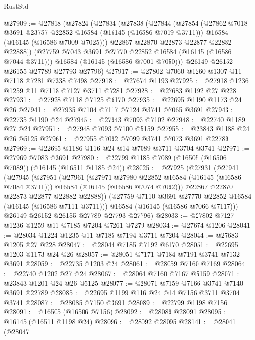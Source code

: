 \begin{lexlean}{RustStd}
\begin{coremodule}
@27909 := @27818
    (@27824
      (@27834
        (@27838
          (@27844
            (@27854
              (@27862 @7018 @3691 @23757 @22852 @16584 (@16145 (@16586 @7019 @3711)))
              @16584
              (@16145 (@16586 @7009 @7025)))
            @22867
            @22870
            @22873
            @22877
            @22882
            @22888))
        (@27759 @7043 @3691 @27770 @22852 @16584 (@16145 (@16586 @7044 @3711)))
        @16584
        (@16145 (@16586 @7001 @7050)))
      @26149
      @26152
      @26155
      @27789
      @27793
      @27796)
@27917 := @27802 @7060 @1260 @1307 @11 @7118 @7281 @7338 @7498
@27918 := @27674 @1193
@27925 := @27918 @1236 @1259 @11 @7118 @7127 @3711 @7281
@27928 := @27683 @1192 @27 @228
@27931 := @27928 @7118 @7125 @6170
@27935 := @22695 @1190 @1173 @24 @26
@27941 := @27935 @7104 @7117 @7124 @3741 @7065 @3691
@27943 := @22735 @1190 @24
@27945 := @27943 @7093 @7102
@27948 := @22740 @1189 @27 @24
@27951 := @27948 @7093 @7100 @5159
@27955 := @23843 @1188 @24 @26 @5125
@27961 := @27955 @7092 @7099 @3741 @7073 @3691 @22789
@27969 := @22695 @1186 @116 @24 @14 @7089 @3711 @3704 @3741
@27971 := @27969 @7083 @3691
@27980 := @22799 @1185 @7089 (@16505 (@16506 @7089)) (@16145 (@16511 @1185 @24))
@28025 := @27925
    (@27931
      (@27941
        (@27945
          (@27951
            (@27961
              (@27971 @27980 @22852 @16584 (@16145 (@16586 @7084 @3711)))
              @16584
              (@16145 (@16586 @7074 @7092)))
            @22867
            @22870
            @22873
            @22877
            @22882
            @22888))
        (@27759 @7110 @3691 @27770 @22852 @16584 (@16145 (@16586 @7111 @3711)))
        @16584
        (@16145 (@16586 @7066 @7117)))
      @26149
      @26152
      @26155
      @27789
      @27793
      @27796)
@28033 := @27802 @7127 @1236 @1259 @11 @7185 @7204 @7261 @7279
@28034 := @27674 @1206
@28041 := @28034 @1224 @1235 @11 @7185 @7194 @3711 @7204
@28044 := @27683 @1205 @27 @228
@28047 := @28044 @7185 @7192 @6170
@28051 := @22695 @1203 @1173 @24 @26
@28057 := @28051 @7171 @7184 @7191 @3741 @7132 @3691
@28059 := @22735 @1203 @24
@28061 := @28059 @7160 @7169
@28064 := @22740 @1202 @27 @24
@28067 := @28064 @7160 @7167 @5159
@28071 := @23843 @1201 @24 @26 @5125
@28077 := @28071 @7159 @7166 @3741 @7140 @3691 @22789
@28085 := @22695 @1199 @116 @24 @14 @7156 @3711 @3704 @3741
@28087 := @28085 @7150 @3691
@28089 := @22799 @1198 @7156
@28091 := @16505 (@16506 @7156)
@28092 := @28089 @28091
@28095 := @16145 (@16511 @1198 @24)
@28096 := @28092 @28095
@28141 := @28041
    (@28047

\end{coremodule}
\end{lexlean}
